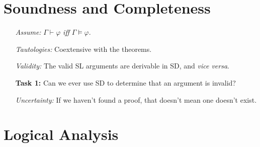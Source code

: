 \documentclass[a4paper, 11pt]{article} %
\begin{document}
\section*{Soundness and Completeness}

\begin{enumerate}
  \item[\it Assume:] $\Gamma \vdash \varphi$ \textit{iff} $\Gamma \vDash \varphi$.
  \item[\it Tautologies:] Coextensive with the theorems.
  \item[\it Validity:] The valid SL arguments are derivable in SD, and \textit{vice versa}.
  \item[\bf Task 1:] Can we ever use SD to determine that an argument is invalid?
  \item[\it Uncertainty:] If we haven't found a proof, that doesn't mean one doesn't exist. 
\end{enumerate}



\section*{Logical Analysis}
\end{document}

